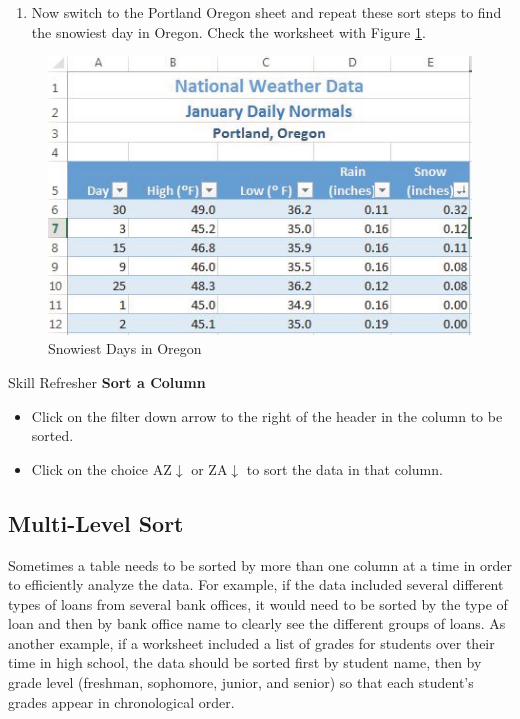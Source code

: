 \begin{enumerate}
	\item Now switch to the Portland Oregon sheet and repeat these sort steps to find the snowiest day in Oregon. Check the worksheet with Figure \ref{05:fig10}.
\end{enumerate}

\begin{figure}[H]
	\centering
	\includegraphics[width=\maxwidth{.95\linewidth}]{gfx/ch05_fig10}
	\caption{Snowiest Days in Oregon}
	\label{05:fig10}
\end{figure}

\begin{center}
	\begin{sklbox}{Skill Refresher}
		\textbf{Sort a Column}
		\\
		\begin{itemize}
			\setlength{\itemsep}{0pt}
			\setlength{\parskip}{0pt}
			\setlength{\parsep}{0pt}

			\item Click on the filter down arrow to the right of the header in the column to be sorted.
			\item Click on the choice AZ$ \downarrow $ or ZA$ \downarrow $ to sort the data in that column.
						
		\end{itemize}
	\end{sklbox}
\end{center}

\subsection{Multi-Level Sort}

Sometimes a table needs to be sorted by more than one column at a time in order to efficiently analyze the data. For example, if the data included several different types of loans from several bank offices, it would need to be sorted by the type of loan and then by bank office name to clearly see the different groups of loans. As another example, if a worksheet included a list of grades for students over their time in high school, the data should be sorted first by student name, then by grade level (freshman, sophomore, junior, and senior) so that each student's grades appear in chronological order.

